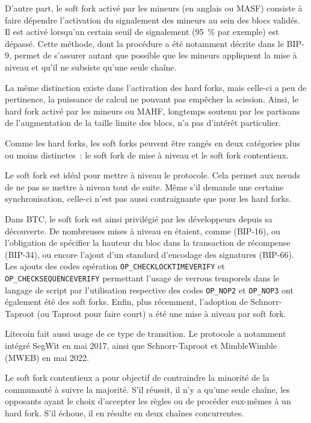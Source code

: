 D'autre part, le soft fork activé par les mineurs (en anglais  ou MASF) consiste à faire dépendre l'activation du signalement des mineurs au sein des blocs validés. Il est activé lorsqu'un certain seuil de signalement (95~\% par exemple) est dépassé. Cette méthode, dont la procédure a été notamment décrite dans le BIP-9, permet de s'assurer autant que possible que les mineurs appliquent la mise à niveau et qu'il ne subsiste qu'une seule chaîne.

La même distinction existe dans l'activation des hard forks, mais celle-ci a peu de pertinence, la puissance de calcul ne pouvant pas empêcher la scission. Ainsi, le hard fork activé par les mineurs ou MAHF, longtemps soutenu par les partisans de l'augmentation de la taille limite des blocs, n'a pas d'intérêt particulier.

Comme les hard forks, les soft forks peuvent être rangés en deux catégories plus ou moins distinctes~: le soft fork de mise à niveau et le soft fork contentieux.

Le soft fork est idéal pour mettre à niveau le protocole. Cela permet aux nœuds de ne pas se mettre à niveau tout de suite. Même s'il demande une certaine synchronisation, celle-ci n'est pas aussi contraignante que pour les hard forks.

Dans BTC, le soft fork est ainsi privilégié par les développeurs depuis sa découverte. De nombreuses mises à niveau en étaient, comme  (BIP-16), ou l'obligation de spécifier la hauteur du bloc dans la transaction de récompense (BIP-34), ou encore l'ajout d'un standard d'encodage des signatures (BIP-66). Les ajouts des codes opération \texttt{OP\_CHECKLOCKTIMEVERIFY} et \texttt{OP\_CHECKSEQUENCEVERIFY} permettant l'usage de verrous temporels dans le langage de script par l'utilisation respective des codes \texttt{OP\_NOP2} et \texttt{OP\_NOP3} ont également été des soft forks. Enfin, plus récemment, l'adoption de Schnorr-Taproot (ou Taproot pour faire court) a été une mise à niveau par soft fork.

Litecoin fait aussi usage de ce type de transition. Le protocole a notamment intégré SegWit en mai 2017, ainsi que Schnorr-Taproot et MimbleWimble (MWEB) en mai 2022.

Le soft fork contentieux a pour objectif de contraindre la minorité de la communauté à suivre la majorité. S'il réussit, il n'y a qu'une seule chaîne, les opposants ayant le choix d'accepter les règles ou de procéder eux-mêmes à un hard fork. S'il échoue, il en résulte en deux chaînes concurrentes.

